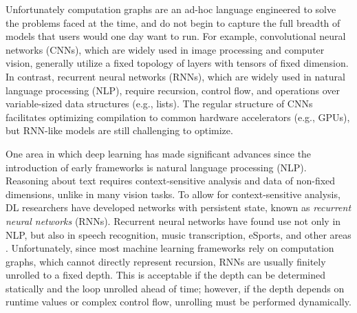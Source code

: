 Unfortunately computation graphs are an ad-hoc language engineered to solve
  the problems faced at the time, and do not begin to capture the full breadth
  of models that users would one day want to run.
For example,
  convolutional neural networks (CNNs),
  which are widely used in image processing and computer vision,
  generally utilize a fixed topology of layers
  with tensors of fixed dimension.
In contrast,
  recurrent neural networks (RNNs),
  which are widely used in natural language processing (NLP),
  require recursion, control flow, and
  operations over variable-sized data structures (e.g., lists).
The regular structure of CNNs facilitates
  optimizing compilation to
  common hardware accelerators (e.g., GPUs), but
  RNN-like models are still challenging to optimize.

One area in which deep learning has made significant advances since
  the introduction of early frameworks is natural language processing (NLP).
Reasoning about text requires context-sensitive analysis and data of
    non-fixed dimensions, unlike in many vision tasks.
 To allow for context-sensitive analysis, DL researchers have developed networks with persistent
  state, known as \textit{recurrent neural networks}  (RNNs).
Recurrent neural networks have found use not only in NLP, but also in speech recognition, music
  transcription, eSports, and other areas \citep{lstm, speech_recognition, OpenAI_dota}.
Unfortunately, since most machine learning frameworks rely on computation graphs,
  which cannot directly represent recursion, RNNs are usually finitely unrolled to a fixed depth.
This is acceptable if the depth can be determined statically and the loop unrolled
  ahead of time; however, if the depth depends on runtime values or complex control flow,
  unrolling must be performed dynamically.

